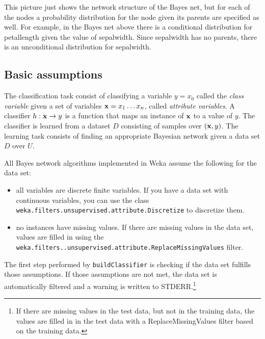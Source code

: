 \documentclass{article}
\begin{document}
\begin{center}
\end{center}

This picture just shows the network structure of the Bayes net, but for
each of the nodes a probability distribution for the node given its parents
are specified as well. For example, in the Bayes net above there is a conditional distribution
for petallength given the value of sepalwidth. Since sepalwidth has no
parents, there is an unconditional distribution for sepalwidth.

\subsection*{Basic assumptions}

The classification task consist of classifying a 
variable $y=x_0$ called the {\em class variable} given a set of variables 
${\bf x} = x_1\ldots x_n$, called {\em attribute variables}. 
A classifier $h:{\bf x}\to y$
is a function that maps an instance of $\bf x$ to a value of $y$.
The classifier is learned from a dataset $D$ consisting of samples 
over $({\bf x}, y)$.
%
The learning task consists of finding an appropriate Bayesian network  
given a data set $D$ over $U$.  

All Bayes network algorithms implemented in Weka assume the following
for the data set:
\begin{itemize}
\item all variables are discrete finite variables. If you have a data set
with continuous variables, you can use the class {\tt weka.filters.unsupervised.attribute.Discretize} 
to discretize them.
\item no instances have missing values. If there are missing values in the
data set, values are filled in using the {\tt weka.filters..unsupervised.attribute.ReplaceMissingValues}
filter.
\end{itemize}

The first step performed by {\tt buildClassifier} is checking if the data set fulfills
those assumptions. If those assumptions are not met, the data set is automatically
filtered and a warning is written to STDERR.\footnote{If there are missing values
in the test data, but not in the training data, the values are filled in in the
test data with a ReplaceMissingValues filter based on the training data.}
\end{document}

